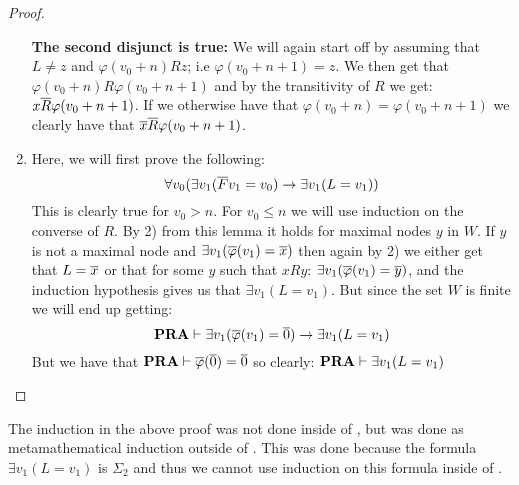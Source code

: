 \documentclass[../main.tex]{subfiles}
\begin{document}
\begin{proof}
\begin{enumerate}
			\textbf{The second disjunct is true:} We will again
			start off by assuming that $L\not =z$ and
			$\varphi(v_0+n)Rz$; i.e $\varphi(v_0+n+1)=z$. We then
			get that $\varphi(v_0+n)R\varphi(v_0+n+1)$ and by the
			transitivity of $R$ we get: $x\overline R\varphi(v_0+n+1)$.
			If we otherwise have that
			$\varphi(v_0+n)=\varphi(v_0+n+1)$ we clearly have that
			$\overline x\overline R\varphi(v_0+n+1)$.

		\item Here, we will first prove the following:
			$$\forall v_0(\exists v_1(\overline
			Fv_1=v_0)\rightarrow\exists v_1(L=v_1))$$
			This is clearly true for $v_0> n$. For $v_0\leq n$ we
			will use induction on the converse of $R$. By 2) from
			this lemma it holds for maximal nodes $y$ in $W$. If
			$y$ is not a maximal node and $\exists v_1(\overline
			\varphi(v_1)=\overline x)$ then again by 2) we either get
			that $L=\overline x$ or that for some $y$ such that $xRy$:
			$\exists v_1(\overline \varphi(v_1)=\overline y)$, and the induction
			hypothesis gives us that $\exists v_1(L=v_1)$. But
			since the set $W$ is finite we will end up
			getting:
			\[\text{\textbf{PRA}}\vdash\exists v_1(\overline\varphi(v_1)=\overline
			0)\rightarrow\exists v_1(L=v_1)\]
			But we have that $\text{\textbf{PRA}}\vdash \overline \varphi(\overline 0)=\overline 0$
			so clearly: $\text{\textbf{PRA}}\vdash\exists v_1(L=v_1)$
\end{enumerate}
\end{proof}

The induction in the above proof was not done inside of \PRA, but was done as
metamathematical induction outside of \PRA. This was done because the formula
$\exists v_1(L=v_1)$ is $\Sigma_2$ and thus we cannot use induction on this
formula inside of \PRA. 
\end{document}
